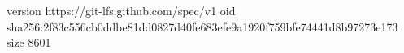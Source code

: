 version https://git-lfs.github.com/spec/v1
oid sha256:2f83c556cb0ddbe81dd0827d40fe683efe9a1920f759bfe74441d8b97273e173
size 8601
